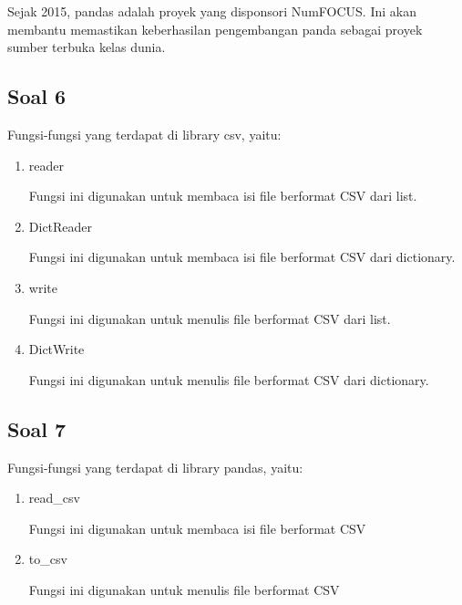 Sejak 2015, pandas adalah proyek yang disponsori NumFOCUS. Ini akan membantu memastikan keberhasilan pengembangan panda sebagai proyek sumber terbuka kelas dunia.

\subsection{Soal 6}
Fungsi-fungsi yang terdapat di library csv, yaitu:
\begin{enumerate}
	\item reader
	
	Fungsi ini digunakan untuk membaca isi file berformat CSV dari list.
	
	
	
	\item DictReader
	
	Fungsi ini digunakan untuk membaca isi file berformat CSV dari dictionary.
	
	
	
	\item write
	
	Fungsi ini digunakan untuk menulis file berformat CSV dari list.
	
	
	
	\item DictWrite
	
	Fungsi ini digunakan untuk menulis file berformat CSV dari dictionary.
	
	
	
\end{enumerate}

\subsection{Soal 7}
Fungsi-fungsi yang terdapat di library pandas, yaitu:
\begin{enumerate}
	\item read\_csv
	
	Fungsi ini digunakan untuk membaca isi file berformat CSV
	
	
	
	\item to\_csv
	
	Fungsi ini digunakan untuk menulis file berformat CSV
	
	
	
\end{enumerate}

